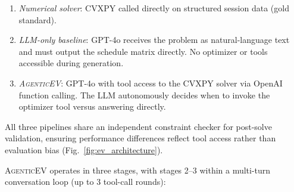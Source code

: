 \begin{enumerate}[leftmargin=*,label=(\Alph*),itemsep=1pt]
\item \textit{Numerical solver}: CVXPY called directly on structured session data (gold standard).
\item \textit{LLM-only baseline}: GPT-4o receives the problem as natural-language text and must output the schedule matrix directly. No optimizer or tools accessible during generation.
\item \textit{\textsc{AgenticEV}}: GPT-4o with tool access to the CVXPY solver via OpenAI function calling. The LLM autonomously decides when to invoke the optimizer tool versus answering directly.
\end{enumerate}

All three pipelines share an independent constraint checker for post-solve validation, ensuring performance differences reflect tool access rather than evaluation bias (Fig.~\ref{fig:ev_architecture}).


\textsc{AgenticEV} operates in three stages, with stages 2--3 within a multi-turn conversation loop (up to 3 tool-call rounds):

